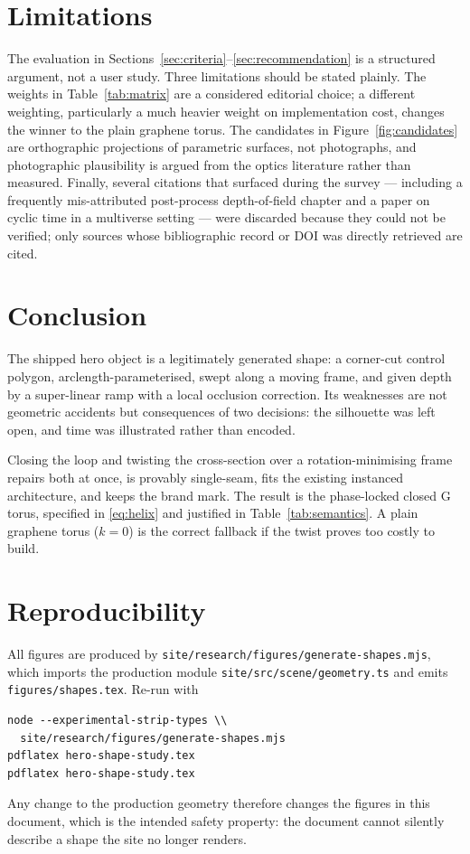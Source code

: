 \documentclass[11pt,a4paper]{article}
\theoremstyle{definition}
\begin{document}
\section{Limitations}

The evaluation in Sections~\ref{sec:criteria}--\ref{sec:recommendation} is a
structured argument, not a user study. Three limitations should be stated
plainly. The weights in Table~\ref{tab:matrix} are a considered editorial
choice; a different weighting, particularly a much heavier weight on
implementation cost, changes the winner to the plain graphene torus. The
candidates in Figure~\ref{fig:candidates} are orthographic projections of
parametric surfaces, not photographs, and photographic plausibility is argued
from the optics literature rather than measured. Finally, several citations
that surfaced during the survey --- including a frequently mis-attributed
post-process depth-of-field chapter and a paper on cyclic time in a
multiverse setting --- were discarded because they could not be verified; only
sources whose bibliographic record or DOI was directly retrieved are cited.

\section{Conclusion}

The shipped hero object is a legitimately generated shape: a corner-cut
control polygon, arclength-parameterised, swept along a moving frame, and
given depth by a super-linear ramp with a local occlusion correction. Its
weaknesses are not geometric accidents but consequences of two decisions: the
silhouette was left open, and time was illustrated rather than encoded.

Closing the loop and twisting the cross-section over a rotation-minimising
frame repairs both at once, is provably single-seam, fits the existing
instanced architecture, and keeps the brand mark. The result is the
phase-locked closed G torus, specified in \eqref{eq:helix} and justified in
Table~\ref{tab:semantics}. A plain graphene torus ($k=0$) is the correct
fallback if the twist proves too costly to build.

\appendix
\section{Reproducibility}

All figures are produced by
\texttt{site/research/figures/generate-shapes.mjs}, which imports the
production module \texttt{site/src/scene/geometry.ts} and emits
\texttt{figures/shapes.tex}. Re-run with
\begin{verbatim}
node --experimental-strip-types \\
  site/research/figures/generate-shapes.mjs
pdflatex hero-shape-study.tex
pdflatex hero-shape-study.tex
\end{verbatim}
Any change to the production geometry therefore changes the figures in this
document, which is the intended safety property: the document cannot silently
describe a shape the site no longer renders.
\end{document}
